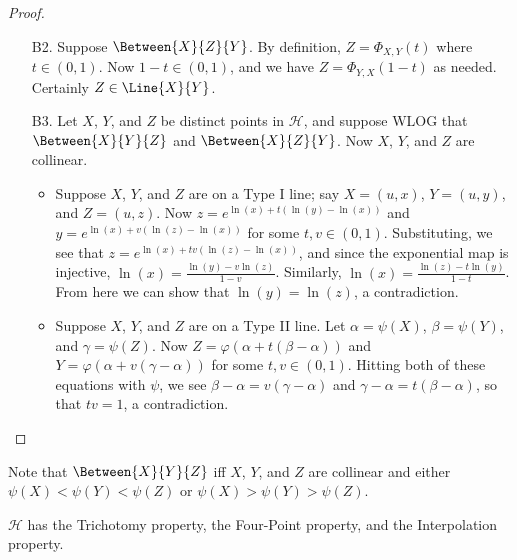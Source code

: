 \begin{proof} \mbox{}
\begin{itemize}
\item[B2.] Suppose \(\Between{X}{Z}{Y}\). By definition, \(Z = \Phi_{X,Y}(t)\) where \(t \in (0,1)\). Now \(1-t \in (0,1)\), and we have \(Z = \Phi_{Y,X}(1-t)\) as needed. Certainly \(Z \in \Line{X}{Y}\).
\item[B3.] Let \(X\), \(Y\), and \(Z\) be distinct points in \(\mathcal{H}\), and suppose WLOG that \(\Between{X}{Y}{Z}\) and \(\Between{X}{Z}{Y}\). Now \(X\), \(Y\), and \(Z\) are collinear.
\begin{itemize}
\item Suppose \(X\), \(Y\), and \(Z\) are on a Type I line; say \(X = (u,x)\), \(Y = (u,y)\), and \(Z = (u,z)\). Now \(z = e^{\ln(x) + t(\ln(y) - \ln(x))}\) and \(y = e^{\ln(x) + v(\ln(z) - \ln(x))}\) for some \(t,v \in (0,1)\). Substituting, we see that \(z = e^{\ln(x) + tv(\ln(z) - \ln(x))}\), and since the exponential map is injective, \(\ln(x) = \frac{\ln(y) - v\ln(z)}{1-v}\). Similarly, \(\ln(x) = \frac{\ln(z) - t\ln(y)}{1-t}\). From here we can show that \(\ln(y) = \ln(z)\), a contradiction.
\item Suppose \(X\), \(Y\), and \(Z\) are on a Type II line. Let \(\alpha = \psi(X)\), \(\beta = \psi(Y)\), and \(\gamma = \psi(Z)\). Now \(Z = \varphi(\alpha + t(\beta - \alpha))\) and \(Y = \varphi(\alpha + v(\gamma - \alpha))\) for some \(t,v \in (0,1)\). Hitting both of these equations with \(\psi\), we see \(\beta - \alpha = v(\gamma - \alpha)\) and \(\gamma - \alpha = t(\beta - \alpha)\), so that \(tv = 1\), a contradiction.
\end{itemize}
\end{itemize}
\end{proof}

Note that \(\Between{X}{Y}{Z}\) iff \(X\), \(Y\), and \(Z\) are collinear and either \(\psi(X) < \psi(Y) < \psi(Z)\) or \(\psi(X) > \psi(Y) > \psi(Z)\).

\begin{prop}
\(\mathcal{H}\) has the Trichotomy property, the Four-Point property, and the Interpolation property.
\end{prop}

